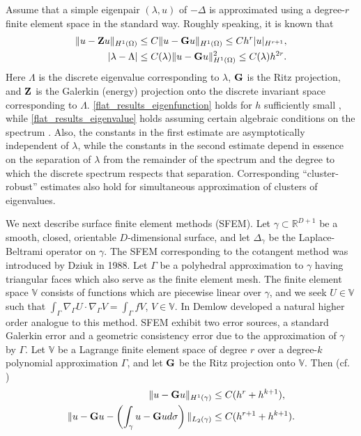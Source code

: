 \documentclass{siamart0516}
\numberwithin{equation}{section}
\numberwithin{theorem}{section}
\numberwithin{figure}{section}
\begin{document}
Assume that a simple eigenpair $(\lambda,u)$ of $-\Delta$ is approximated using a degree-$r$ finite element space in the standard way.  
Roughly speaking, it is known that
\begin{align}
\label{flat_results_eigenfunction}
\|u-{\bf Z} u\|_{H^1(\Omega)} & \leq C \|u-{\bf G} u\|_{H^1(\Omega)} \le C h^r|u|_{H^{r+1}}, 
\\ |\lambda-\Lambda| & \le C(\lambda) \|u-{\bf G} u\|_{H^1(\Omega)}^2 \le C(\lambda) h^{2r}.   
\label{flat_results_eigenvalue}
\end{align}
Here $\Lambda$ is the discrete eigenvalue corresponding to $\lambda$, ${\bf G}$ is the Ritz projection, and ${\bf Z}$ is the Galerkin (energy) projection onto the discrete invariant space corresponding to $\Lambda$.  \eqref{flat_results_eigenfunction} holds for $h$ sufficiently small \cite{CaGe11, Gallistl}, while \eqref{flat_results_eigenvalue} holds assuming certain algebraic conditions on the spectrum \cite{KO06}.  Also, the constants in the first estimate are asymptotically independent of $\lambda$, while the constants in the second estimate depend in essence on the separation of $\lambda$ from the remainder of the spectrum and the degree to which the discrete spectrum respects that separation.  Corresponding ``cluster-robust'' estimates also hold for simultaneous approximation of clusters of eigenvalues.

We next describe surface finite element methods (SFEM).  Let $\gamma \subset \mathbb{R}^{D+1}$ be a smooth, closed, orientable $D$-dimensional surface, and let $\Delta_\gamma$ be the Laplace-Beltrami operator on $\gamma$.  The SFEM corresponding to the cotangent method was introduced by Dziuk \cite{Dziuk} in 1988.  Let $\Gamma$ be a polyhedral approximation to $\gamma$ having triangular faces which also serve as the finite element mesh.  The finite element space $\mathbb{V}$ consists of functions which are piecewise linear over $\gamma$, and we seek $U \in \mathbb{V}$ such that $\int_{\Gamma} \nabla_{\Gamma} U \cdot\nabla_{\Gamma} V = \int_{\Gamma} f V$, $V \in \mathbb{V}$.  In \cite{D09} Demlow developed a natural higher order analogue to this method.  SFEM exhibit two error sources, a standard Galerkin error and a geometric consistency error due to the approximation of $\gamma$ by $\Gamma$. Let $\mathbb{V}$ be a Lagrange finite element space of degree $r$ over a degree-$k$ polynomial approximation $\Gamma$, and let ${\bf G}$ be the Ritz projection onto $\mathbb{V}$.  Then (cf. \cite{Dziuk, D09}) 
\begin{align}
\|u - {\bf G} u\|_{H^1(\gamma)} &\leq C( h^r + h^{k+1}),
\label{D-abound}
\\
\|u - {\bf G} u - \left(\int_{\gamma}u - {\bf G} u d\sigma\right)\|_{L_2(\gamma)} &\leq C( h^{r+1} + h^{k+1}).
\label{D-mbound}
\end{align} 
\end{document}
